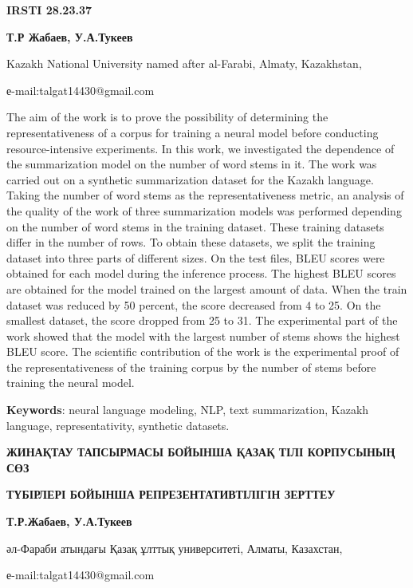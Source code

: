 \newpage
{\bfseries IRSTI 28.23.37}


\begin{center}
{\bfseries Т.Р Жабаев, У.А.Тукеев}

Kazakh National University named after al-Farabi, Almaty, Kazakhstan,

е-mail:talgat14430@gmail.com
\end{center}

The aim of the work is to prove the possibility of determining the
representativeness of a corpus for training a neural model before
conducting resource-intensive experiments. In this work, we investigated
the dependence of the summarization model on the number of word stems in
it. The work was carried out on a synthetic summarization dataset for
the Kazakh language. Taking the number of word stems as the
representativeness metric, an analysis of the quality of the work of
three summarization models was performed depending on the number of word
stems in the training dataset. These training datasets differ in the
number of rows. To obtain these datasets, we split the training dataset
into three parts of different sizes. On the test files, BLEU scores were
obtained for each model during the inference process. The highest BLEU
scores are obtained for the model trained on the largest amount of data.
When the train dataset was reduced by 50 percent, the score decreased
from 4 to 25. On the smallest dataset, the score dropped from 25 to 31.
The experimental part of the work showed that the model with the largest
number of stems shows the highest BLEU score. The scientific
contribution of the work is the experimental proof of the
representativeness of the training corpus by the number of stems before
training the neural model.

{\bfseries Keywords}: neural language modeling, NLP, text summarization,
Kazakh language, representativity, synthetic datasets.

\begin{center}
{\large\bfseries ЖИНАҚТАУ ТАПСЫРМАСЫ БОЙЫНША ҚАЗАҚ ТІЛІ КОРПУСЫНЫҢ СӨЗ}

{\bfseries ТҮБІРЛЕРІ БОЙЫНША РЕПРЕЗЕНТАТИВТІЛІГІН ЗЕРТТЕУ}

{\bfseries Т.Р.Жабаев, У.А.Тукеев}

әл-Фараби атындағы Қазақ ұлттық университеті, Алматы, Казахстан,

е-mail:talgat14430@gmail.com
\end{center}

